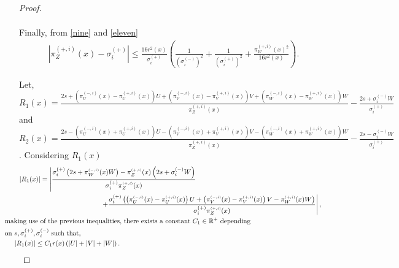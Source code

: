 \documentclass[12pt]{article}
\theoremstyle{Theorem}
\theoremstyle{definition}
\begin{document}
\begin{proof}
\begin{itemize}
\begin{align}
  \end{align}
 Finally, from \eqref{nine} and \eqref{eleven}
  \begin{align}
  \left|\pi^{\scriptscriptstyle(+, i)}_{Z}(x) - \sigma^{(+)}_{i}\right| \leq \frac{16r^{2}(x)}{\sigma^{(+)}_{i}}\left(\frac{1}{(\sigma^{(-)}_{i})^{2}} + \frac{1}{(\sigma^{(+)}_{i})^{2}} +  \frac{\pi^{\scriptscriptstyle(+, i)}_{W}(x)^{2}}{16r^{2}(x)} \right).
  \end{align}
\end{itemize} 
Let, $R_{1}(x) = \frac{2s + \left( \pi^{\scriptscriptstyle(-, i)}_{U}(x)- \pi^{\scriptscriptstyle(+, i)}_{U}(x)\right) U + \left(\pi^{\scriptscriptstyle(-, i)}_{V}(x)- \pi^{\scriptscriptstyle(+, i)}_{V}(x)\right)V + \left(\pi^{\scriptscriptstyle(-, i)}_{W}(x) - \pi^{\scriptscriptstyle(+, i)}_{W}(x)\right) W}{\pi^{\scriptscriptstyle(+, i)}_{Z}(x)} - \frac{2s + \sigma^{\scriptscriptstyle (-)}_{i}W}{\sigma^{\scriptscriptstyle (+)}_{i}}$ and $ R_{2}(x) = \frac{2s - \left( \pi^{\scriptscriptstyle(-, i)}_{U}(x)+\pi^{\scriptscriptstyle(+, i)}_{U}(x)\right) U - \left(\pi^{\scriptscriptstyle(-, i)}_{V}(x)+\pi^{\scriptscriptstyle(+, i)}_{V}(x)\right)V - \left(\pi^{\scriptscriptstyle(-, i)}_{W}(x) +\pi^{\scriptscriptstyle(+, i)}_{W}(x)\right) W}{\pi^{\scriptscriptstyle(+, i)}_{Z}(x)} - \frac{2s - \sigma^{\scriptscriptstyle (-)}_{i}W}{\sigma^{\scriptscriptstyle (+)}_{i}} $. Considering $R_{1}(x)$
{\small
\begin{align*}
|R_{1}(x)| = \left|\frac{\sigma^{(+)}_{i}\left(2s + \pi^{\scriptscriptstyle(-, i)}_{W}(x) W\right) - \pi^{\scriptscriptstyle(+, i)}_{Z}(x)\left( 2s +  \sigma^{(-)}_{i}W\right)}{\sigma^{(+)}_{i}\pi^{\scriptscriptstyle(+, i)}_{Z}(x)} \right.\\
& \hspace{-5cm} \left. + \frac{\sigma^{(+)}_{i}\left(\left( \pi^{\scriptscriptstyle(-, i)}_{U}(x)- \pi^{\scriptscriptstyle(+, i)}_{U}(x)\right) U + \left(\pi^{\scriptscriptstyle(-, i)}_{V}(x)- \pi^{\scriptscriptstyle(+, i)}_{V}(x)\right)V - \pi^{\scriptscriptstyle(+, i)}_{W}(x) W \right)}{\sigma^{(+)}_{i}\pi^{\scriptscriptstyle(+, i)}_{Z}(x)}\right|, \\
& \hspace{-10cm} \text{making use of the previous inequalities, there exists a constant $C_{1} \in \mathbb{R}^{+}$ depending}\\
& \hspace{-10cm}  \text{on $s, \sigma^{(+)}_{i}, \sigma^{(-)}_{i}$ such that,} \\
  & \hspace{-9.5cm} |R_{1}(x)|  \leq C_{1}r(x)\left(|U| + |V| + |W|\right).

\end{align*}}
\end{proof}
\end{document}

